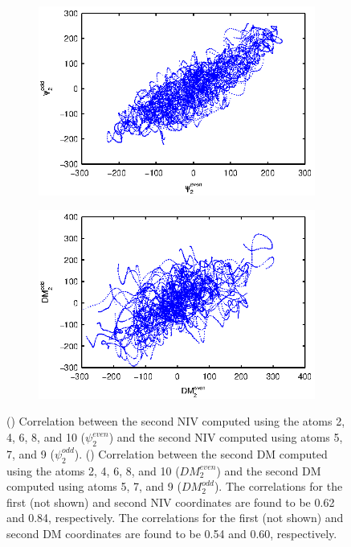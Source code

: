 \begin{figure}[t]
\centering
\begin{subfigure}{0.4\textwidth}
\includegraphics[width=\textwidth]{NLICA_corr}
\caption{}
\label{subfig:ala_corr1}
\end{subfigure}
\begin{subfigure}{0.4\textwidth}
\includegraphics[width=\textwidth]{DM_corr}
\caption{}
\label{subfig:ala_corr2}
\end{subfigure}    
\caption[Comparison of intrinsic variable and diffusion maps embeddings for alanine dipeptide data]{() Correlation between the second NIV computed using the atoms 2, 4, 6, 8, and 10 ($\psi_2^{even}$) and the second NIV computed using atoms 5, 7, and 9 ($\psi_2^{odd}$).
    () Correlation between the second DM computed using the atoms 2, 4, 6, 8, and 10 ($DM_2^{even}$) and the second DM computed using atoms 5, 7, and 9 ($DM_2^{odd}$).
    The correlations for the first (not shown) and second NIV coordinates are found to be 0.62 and 0.84, respectively.
    The correlations for the first (not shown) and second DM coordinates are found to be 0.54 and 0.60, respectively. }
    \label{fig:ala_corr}
\end{figure}


